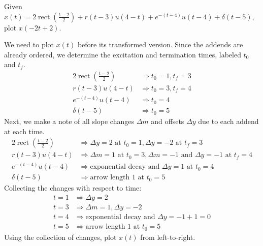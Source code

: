 \documentclass{report}
\begin{document}
\begin{example}
    Given $x(t)=2\operatorname{rect}\left(\frac{t-2}{2}\right)+r(t-3)u(4-t)+e^{-(t-4)}u(t-4)+\delta(t-5)$, plot $x(-2t+2)$.
\end{example}
\begin{solution}
    We need to plot $x(t)$ before its transformed version. Since the addends are already ordered, we determine the excitation and termination times, labeled $t_0$ and $t_f$.
    \begin{align*}
        2\operatorname{rect}\left(\frac{t-2}{2}\right) &\Longrightarrow t_0 = 1, t_f = 3 \\
        r(t-3)u(4-t) &\Longrightarrow t_0=3, t_f=4 \\
        e^{-(t-4)}u(t-4) &\Longrightarrow t_0 = 4 \\
        \delta(t-5) &\Longrightarrow t_0 = 5
    \end{align*}
    Next, we make a note of all slope changes $\Delta m$ and offsets $\Delta y$ due to each addend at each time.
    \begin{align*}
        2\operatorname{rect}\left(\frac{t-2}{2}\right) &\Longrightarrow \Delta y = 2 \text{ at } t_0 = 1, \Delta y = -2 \text{ at } t_f = 3 \\
        r(t-3)u(4-t) &\Longrightarrow \Delta m = 1 \text{ at } t_0=3, \Delta m = -1 \text{ and } \Delta y = -1 \text{ at } t_f = 4 \\
        e^{-(t-4)}u(t-4) &\Longrightarrow \text{exponential decay and } \Delta y = 1 \text{ at } t_0 = 4 \\
        \delta(t-5) &\Longrightarrow \text{arrow length 1 at } t_0 = 5
    \end{align*}
    Collecting the changes with respect to time:
    \begin{align*}
        t=1 &\Longrightarrow \Delta y = 2 \\
        t=3 &\Longrightarrow \Delta m = 1, \Delta y = -2 \\
        t=4 &\Longrightarrow \text{exponential decay and } \Delta y = -1+1=0 \\
        t=5 &\Longrightarrow \text{arrow length 1 at } t_0 = 5
    \end{align*}
    Using the collection of changes, plot $x(t)$ from left-to-right. \\ \\
    \begin{tikzpicture}
        [declare function={
            func(\x)= (\x < 1) * (0) + and(\x >= 1, \x < 3) * (2) + and(\x > 3, \x < 4) * (\x - 3) + (\x > 4) * (exp(-(\x - 4))); }]

\end{tikzpicture}
\end{solution}
\end{document}
